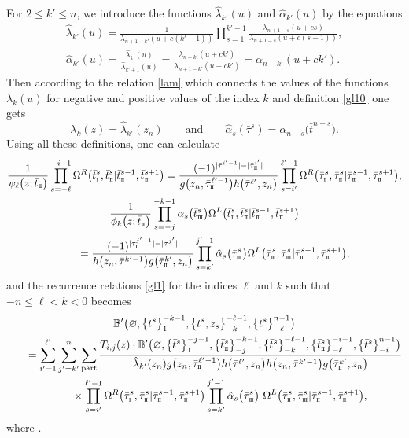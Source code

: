 \documentclass[pdftex]{sigma}
\newcommand{\so}{\scriptscriptstyle \rm I}
\newcommand{\st}{\scriptscriptstyle \rm I\hspace{-1pt}I}
\newcommand{\sth}{\scriptscriptstyle \rm I\hspace{-1pt}I\hspace{-1pt}I}
\newcommand{\bt}{{\bar t}}
\newcommand{\btt}{{\bar\tau}}
\theoremstyle{definition}
\def\BB{{\mathbb{B}}}
\def\r#1{\eqref{#1}}
\def\Oml{\Omega^L}
\def\Omr{\Omega^R}
\def\lp{{\ell'}}
\def\kp{{k'}}
\def\ip{{i'}}
\def\jp{{j'}}
\def\hlam{\hat{\lambda}}
\def\halp{\hat{\alpha}}
\begin{document}
For $2\leq\kp\leq n$, we introduce the functions $\hlam_\kp(u)$
and $\halp_{\kp}(u)$ by the equations
\begin{gather*}%
\hlam_\kp(u)=\frac{1}{\lambda_{n+1-\kp}(u+c(\kp-1))}
\prod_{s=1}^{\kp-1}\frac{\lambda_{n+1-s}(u+cs)}{\lambda_{n+1-s}(u+c(s-1))},\\
\halp_{\kp}(u)=\frac{\hlam_\kp(u)}{\hlam_{\kp+1}(u)}=
\frac{\lambda_{n-\kp}(u+c\kp)}{\lambda_{n+1-\kp}(u+c\kp)}
 ={\alpha_{n-\kp}(u+c\kp)} .
\end{gather*}
Then according to the relation \r{lam} which connects the values of the functions
$\lambda_k(u)$ for negative and positive values of the index $k$
and definition \r{gl10} one gets
\begin{equation}\label{gl13}
\lambda_k(z)=\hlam_\kp(z_n)\qquad \mbox{and}\qquad
\halp_s(\btt^s)=\alpha_{n-s}\bigl(\bt^{n-s}\bigr) .
\end{equation}
Using all these definitions, one can calculate
\begin{gather*}%
\frac{1}{\psi_\ell\bigl(z;\bt_{\st}\bigr)}
\prod_{s=-\ell}^{-i-1}\Omr\bigl(\bt^s_{\so},\bt^s_{{\st}}|\bt^{s-1}_{\st},\bt^{s+1}_{\st}\bigr)
=\frac{(-1)^{|\btt^{\ip-1}|-|\btt^{\ip}_{\st}|}}
{g\bigl(z_n,\btt^{\lp-1}_{\st}\bigr) h\bigl(\btt^{\lp},z_n\bigr)}
\prod_{s=\ip}^{\lp-1}\Omr\bigl(\btt^s_{\so},\btt^s_{{\st}}|\btt^{s-1}_{\st},\btt^{s+1}_{\st}\bigr) ,
\\
\frac{1}{\phi_k\bigl(z;\bt_{\st}\bigr)}
\prod_{s=-j}^{-k-1}\alpha_s\bigl(\bt^s_{\sth}\bigr)
\Oml\bigl(\bt^s_{\so},\bt^s_{{\st}}|\bt^{s-1}_{\st},\bt^{s+1}_{\st}\bigr)
\\
\qquad= \frac{(-1)^{|\btt^{\jp-1}_{\st}|-|\btt^{\jp}|}}
{h\bigl(z_n,\btt^{\kp-1}\bigr) g\bigl(\btt^{\kp}_{\st},z_n\bigr)}
\prod_{s=\kp}^{\jp-1}\halp_s\bigl(\btt^s_{\sth}\bigr)
\Oml\bigl(\btt^s_{\st},\btt^s_{{\sth}}|\btt^{s-1}_{\st},\btt^{s+1}_{\st}\bigr),
\end{gather*}
and the recurrence relations \r{gl1}
for the indices $\ell$ and $k$ such that
$-n\leq \ell<k<0$ becomes
\begin{gather}
\BB'\bigl(\varnothing,\bigl\{\bt^s\bigr\}_1^{-k-1},\bigl\{\bt^s,z_s\bigr\}_{-k}^{-\ell-1},\bigl\{\bt^s\bigr\}_{-\ell}^{n-1}\bigr)\nonumber\\
\qquad= \sum_{\ip=1}^\lp\sum_{\jp=\kp}^n \sum_{\rm part}
\frac{T_{i,j}(z)
\cdot\BB'\bigl(\varnothing,\bigl\{\bt^s\bigr\}_{1}^{-j-1},
\bigl\{\bt^s_{\st}\bigr\}_{-j}^{-k-1},
\bigl\{\bt^s\bigr\}_{-k}^{-\ell-1},\bigl\{\bt^s_{\st}\bigr\}_{-\ell}^{-i-1},\bigl\{\bt^s\bigr\}_{-i}^{n-1}\bigr)}
{\hlam_\kp(z_n) g\bigl(z_n,\btt^{\lp-1}_{\st}\bigr) h\bigl(\btt^\lp,z_n\bigr)
 h\bigl(z_n,\btt^{\kp-1}\bigr) g\bigl(\btt^\kp_{\st},z_n\bigr)}\nonumber\\
\phantom{\qquad=}{}\times
\prod_{s=\ip}^{\lp-1}\Omr\bigl(\btt^s_{\so},\btt^s_{\st}|\btt^{s-1}_{\st},\btt^{s+1}_{\st}\bigr)
\prod_{s=\kp}^{\jp-1}\halp_s\bigl(\btt^s_{\sth}\bigr)\
\Oml\bigl(\btt^s_{\st},\btt^s_{\sth}|\btt^{s-1}_{\st},\btt^{s+1}_{\st}\bigr),\label{gl-recpp}
\end{gather}
where
\smash{$
 \BB'\bigl(\bt\bigr) = (-1)^{\sum_{s=1}^{n-2} |\bt^{s}| |\bt^{s+1}| + \sum_{s=1}^{n-1} |\bt^{s}|} \BB\bigl(\bt\bigr)$}.
\end{document}
